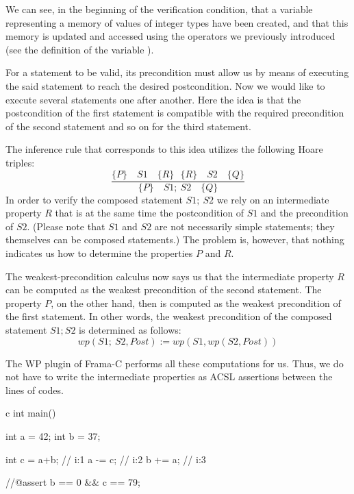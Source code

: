 

We can see, in the beginning of the verification condition, that a variable
 representing a memory of values of integer types have been
created, and that this memory is updated and accessed using the operators we
previously introduced (see the definition of the variable ).



For a statement to be valid, its precondition must allow us by means of
executing the said statement to reach the desired postcondition. Now we
would like to execute several statements one after another. Here the
idea is that the postcondition of the first statement is compatible with
the required precondition of the second statement and so on for the
third statement.



The inference rule that corresponds to this idea utilizes the following
Hoare triples:
$$\dfrac{\{P\}\quad S1 \quad \{R\} \ \ \ \{R\}\quad S2 \quad \{Q\}}{\{P\}\quad S1 ;\ S2 \quad \{Q\}}$$
In order to verify the composed statement $S1;\ S2$ we rely on an
intermediate property $R$ that is at the same time the postcondition
of $S1$ and the precondition of $S2$. (Please note that $S1$ and
$S2$ are not necessarily simple statements; they themselves can be
composed statements.) The problem is, however, that nothing indicates us
how to determine the properties $P$ and $R$.

The weakest-precondition calculus now says us that the intermediate
property $R$ can be computed as the weakest precondition of the second
statement. The property $P$, on the other hand, then is computed as
the weakest precondition of the first statement. In other words, the
weakest precondition of the composed statement $S1; S2$ is determined
as follows:
$$wp(S1;\ S2 , Post) := wp(S1, wp(S2, Post) )$$


The WP plugin of Frama-C performs all these computations for us. Thus,
we do not have to write the intermediate properties as ACSL assertions
between the lines of codes.



\begin{CodeBlock}{c}
int main(){
  int a = 42;
  int b = 37;

  int c = a+b; // i:1
  a -= c;      // i:2
  b += a;      // i:3

  //@assert b == 0 && c == 79;
}
\end{CodeBlock}



